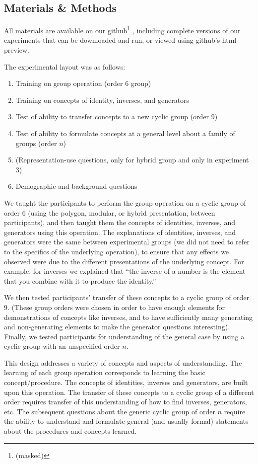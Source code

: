 \documentclass[man,10pt]{apa6}
\begin{document}
\subsection{Materials \& Methods} 
All materials are available on our github\footnote{(masked)}%
, including complete versions of our experiments that can be downloaded and run, or viewed using github's html preview. \par
The experimental layout was as follows:
\begin{enumerate}
\item Training on group operation (order 6 group)
\item Training on concepts of identity, inverses, and generators
\item Test of ability to transfer concepts to a new cyclic group (order 9)
\item Test of ability to formulate concepts at a general level about a family of groups (order $n$)
\item (Representation-use questions, only for hybrid group and only in experiment 3)
\item Demographic and background questions
\end{enumerate}
We taught the participants to perform the group operation on a cyclic group of order 6 (using the polygon, modular, or hybrid presentation, between participants), and then taught them the concepts of identities, inverses, and generators using this operation. The explanations of identities, inverses, and generators were the same between experimental groups (we did not need to refer to the specifics of the underlying operation), to ensure that any effects we observed were due to the different presentations of the underlying concept. For example, for inverses we explained that ``the inverse of a number is the element that you combine with it to produce the identity.''\par
We then tested participants' transfer of these concepts to a cyclic group of order 9. (These group orders were chosen in order to have enough elements for demonstrations of concepts like inverses, and to have sufficiently many generating and non-generating elements to make the generator questions interesting). Finally, we tested participants for understanding of the general case by using a cyclic group with an unspecified order $n$. \par
This design addresses a variety of concepts and aspects of understanding. The learning of each group operation corresponds to learning the basic concept/procedure. The concepts of identities, inverses and generators, are built upon this operation. The transfer of these concepts to a cyclic group of a different order requires transfer of this understanding of how to find inverses, generators, etc. The subsequent questions about the generic cyclic group of order $n$ require the ability to understand and formulate general (and usually formal) statements about the procedures and concepts learned. 
\end{document}
